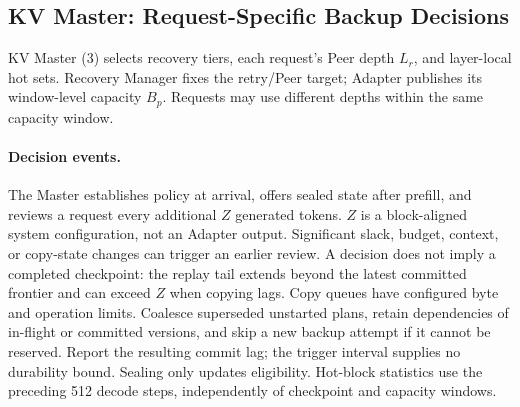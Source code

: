 \subsection{KV Master: Request-Specific Backup Decisions}
\label{sec:kv-placement}
\label{sec:kv-master}

KV Master (3) selects recovery tiers, each request's Peer depth $L_r$,
and layer-local hot sets. Recovery Manager fixes the retry/Peer target;
Adapter publishes its window-level capacity $B_p$. Requests may use
different depths within the same capacity window.

\paragraph{Decision events.}
The Master establishes policy at arrival, offers sealed state after prefill,
and reviews a request every additional $Z$ generated tokens. $Z$ is a
block-aligned system configuration, not an Adapter output. Significant
slack, budget, context, or copy-state changes can trigger an earlier review.
A decision does not imply a completed checkpoint: the replay tail extends
beyond the latest committed frontier and can exceed $Z$ when copying lags.
Copy queues have configured byte and operation limits. Coalesce superseded
unstarted plans, retain dependencies of in-flight or committed versions,
and skip a new backup attempt if it cannot be reserved. Report the resulting
commit lag; the trigger interval supplies no durability bound.
Sealing only updates eligibility. Hot-block statistics use the preceding
512 decode steps, independently of checkpoint and capacity windows.

